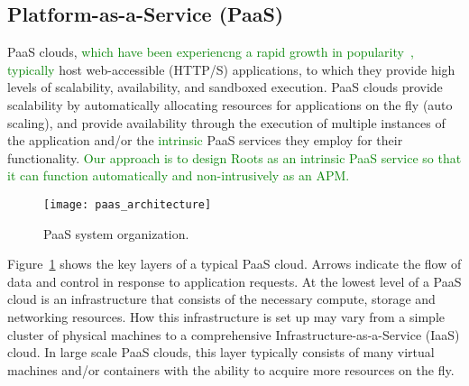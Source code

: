 \subsection{Platform-as-a-Service (PaaS)}

PaaS clouds, \textcolor{green}{which have been experiencng a rapid growth in 
popularity~\cite{paas-growth,paas-growth2},
typically} host web-accessible (HTTP/S) applications, to which they provide
high levels of scalability, availability, and sandboxed execution.  PaaS
clouds provide scalability by automatically allocating resources for
applications on the fly (auto scaling), and provide availability through the
execution of multiple instances of the application and/or the 
\textcolor{green}{intrinsic} PaaS services
they employ for their functionality.  
\textcolor{green}{Our approach is to design Roots as an intrinsic PaaS service
so that it can function automatically and non-intrusively as an APM.}

\begin{figure}
\centering
\texttt{[image: paas\_architecture]}
\caption{PaaS system organization.}
\label{fig:paas_architecture}
\end{figure}

Figure~\ref{fig:paas_architecture} shows the key layers of a typical PaaS cloud. Arrows indicate
the flow of data and control in response to application requests.
At the lowest level of a PaaS cloud is an infrastructure that consists of the necessary compute, storage
and networking resources. How this infrastructure is set up may vary from a simple cluster of physical 
machines to a comprehensive Infrastructure-as-a-Service (IaaS) cloud. In large scale PaaS clouds,
this layer typically consists of many virtual machines and/or containers with the ability to acquire more
resources on the fly.

